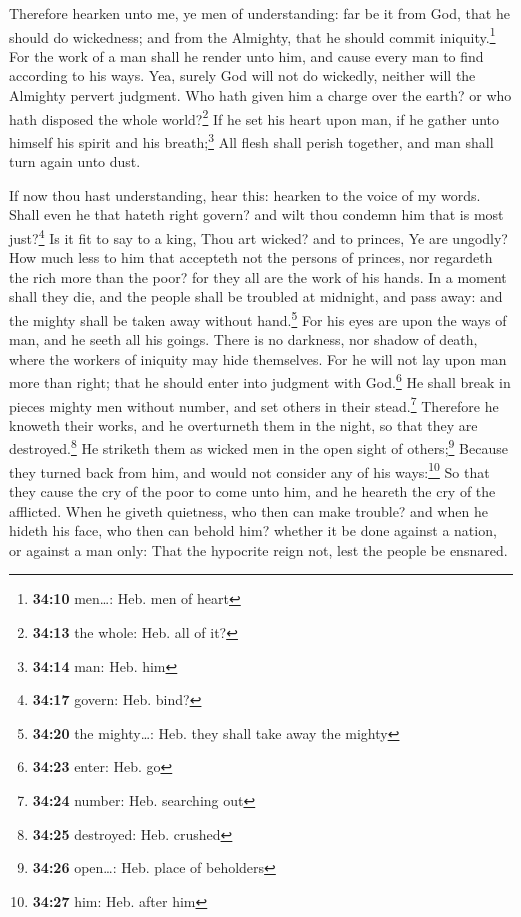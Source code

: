  Therefore hearken unto me, ye men of understanding: far
be it from God, that he should do wickedness; and from the Almighty,
that he should commit iniquity.\footnote{\textbf{34:10} men\ldots: Heb.
  men of heart}  For the work of a man shall he render
unto him, and cause every man to find according to his ways.
 Yea, surely God will not do wickedly, neither will the
Almighty pervert judgment.  Who hath given him a charge
over the earth? or who hath disposed the whole world?\footnote{\textbf{34:13}
  the whole: Heb. all of it?}  If he set his heart upon
man, if he gather unto himself his spirit and his breath;\footnote{\textbf{34:14}
  man: Heb. him}  All flesh shall perish together, and
man shall turn again unto dust.

 If now thou hast understanding, hear this: hearken to
the voice of my words.  Shall even he that hateth right
govern? and wilt thou condemn him that is most just?\footnote{\textbf{34:17}
  govern: Heb. bind?}  Is it fit to say to a king, Thou
art wicked? and to princes, Ye are ungodly?  How much
less to him that accepteth not the persons of princes, nor regardeth the
rich more than the poor? for they all are the work of his hands.
 In a moment shall they die, and the people shall be
troubled at midnight, and pass away: and the mighty shall be taken away
without hand.\footnote{\textbf{34:20} the mighty\ldots: Heb. they shall
  take away the mighty}  For his eyes are upon the ways
of man, and he seeth all his goings.  There is no
darkness, nor shadow of death, where the workers of iniquity may hide
themselves.  For he will not lay upon man more than
right; that he should enter into judgment with God.\footnote{\textbf{34:23}
  enter: Heb. go}  He shall break in pieces mighty men
without number, and set others in their stead.\footnote{\textbf{34:24}
  number: Heb. searching out}  Therefore he knoweth their
works, and he overturneth them in the night, so that they are
destroyed.\footnote{\textbf{34:25} destroyed: Heb. crushed}
 He striketh them as wicked men in the open sight of
others;\footnote{\textbf{34:26} open\ldots: Heb. place of beholders}
 Because they turned back from him, and would not
consider any of his ways:\footnote{\textbf{34:27} him: Heb. after him}
 So that they cause the cry of the poor to come unto him,
and he heareth the cry of the afflicted.  When he giveth
quietness, who then can make trouble? and when he hideth his face, who
then can behold him? whether it be done against a nation, or against a
man only:  That the hypocrite reign not, lest the people
be ensnared.

